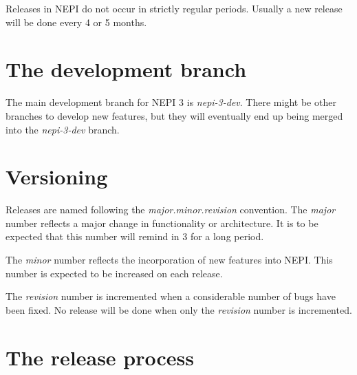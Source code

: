%
%
%
%
%
%

Releases in NEPI do not occur in strictly regular periods. Usually a new
release will be done every 4 or 5 months.

\section{The development branch}

The main development branch for NEPI 3 is \emph{nepi-3-dev}. 
There might be other branches to develop new features, but they will 
eventually end up being merged into the \emph{nepi-3-dev} branch. 

\section{Versioning}

Releases are named following the \emph{major.minor.revision} convention.
The \emph{major} number reflects a major change in functionality or architecture. 
It is to be expected that this number will remind in 3 for a long period.

The \emph{minor} number reflects the incorporation of new features into NEPI.
This number is expected to be increased on each release.

The \emph{revision} number is incremented when a considerable number of
bugs have been fixed. No release will be done when only the \emph{revision}
number is incremented.

\section{The release process}

